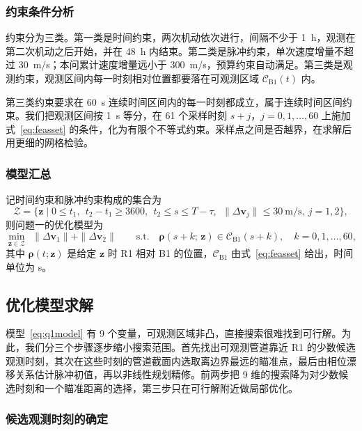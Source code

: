 \subsubsection{约束条件分析}

约束分为三类。第一类是时间约束，两次机动依次进行，间隔不少于 1~h，观测在第二次机动之后开始，并在 48~h 内结束。第二类是脉冲约束，单次速度增量不超过 30~m/s；本问累计速度增量远小于 300~m/s，预算约束自动满足。第三类是观测约束，观测区间内每一时刻相对位置都要落在可观测区域 $\mathcal C_{\mathrm{B1}}(t)$ 内。

第三类约束要求在 60~s 连续时间区间内的每一时刻都成立，属于连续时间区间约束。我们把观测区间按 1~s 等分，在 61 个采样时刻 $s + j$，$j = 0, 1, \dots, 60$ 上施加式~\eqref{eq:feasset} 的条件，化为有限个不等式约束。采样点之间是否越界，在求解后用更细的网格检验。

\subsubsection{模型汇总}

记时间约束和脉冲约束构成的集合为
\begin{equation}
  \mathcal Z = \big\{\bm z \;\big|\; 0 \le t_1,\ \ t_2 - t_1 \ge 3600,\ \ t_2 \le s \le T - \tau,\ \ \|\Delta\bm v_j\| \le 30~\mathrm{m/s},\ j = 1,2\big\},
  \label{eq:q1set}
\end{equation}
则问题一的优化模型为
\begin{equation}
  \min_{\bm z\in\mathcal Z}\ \ \|\Delta\bm v_1\| + \|\Delta\bm v_2\| \qquad \text{s.t.}\quad \bm\rho(s + k;\,\bm z) \in \mathcal C_{\mathrm{B1}}(s + k),\quad k = 0, 1, \dots, 60 ,
  \label{eq:q1model}
\end{equation}
其中 $\bm\rho(t;\bm z)$ 是给定 $\bm z$ 时 R1 相对 B1 的位置，$\mathcal C_{\mathrm{B1}}$ 由式~\eqref{eq:feasset} 给出，时间单位为 s。

\subsection{优化模型求解}

模型~\eqref{eq:q1model} 有 9 个变量，可观测区域非凸，直接搜索很难找到可行解。为此，我们分三个步骤逐步缩小搜索范围。首先找出可观测管道靠近 R1 的少数候选观测时刻，其次在这些时刻的管道截面内选取离边界最远的瞄准点，最后由相位漂移关系估计脉冲初值，再以非线性规划精修。前两步把 9 维的搜索降为对少数候选时刻和一个瞄准距离的选择，第三步只在可行解附近做局部优化。

\subsubsection{候选观测时刻的确定}

